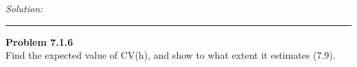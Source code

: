 \documentclass[a4paper, 11pt]{article}
\newenvironment{problem}[2][Problem]
    { \begin{mdframed}[backgroundcolor=gray!20] \textbf{#1 #2} \\}
    {  \end{mdframed}}
\newenvironment{solution}
    {\textit{Solution:}}
    {}
\begin{document}
\begin{solution}



\end{solution}

\noindent\rule{7in}{2.8pt}

\begin{problem}{7.1.6}
 Find the expected value of CV(h), and show to what extent it estimates (7.9).
 
\end{problem}
\end{document}
